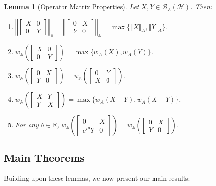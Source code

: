\documentclass{article}
\newcommand{\norm}[1]{\left\Vert#1\right\Vert}
\newtheorem{lemma}[theorem]{Lemma}
\begin{document}
\begin{lemma}[Operator Matrix Properties]
\label{lem:op_matrix}
Let $X, Y \in \mathcal{B}_A(\mathcal{H})$. Then:
\begin{enumerate}
    \item $\norm{\begin{bmatrix} X & 0 \\ 0 & Y \end{bmatrix}}_{\mathbb{A}} = \norm{\begin{bmatrix} 0 & X \\ Y & 0 \end{bmatrix}}_{\mathbb{A}} = \max\{\norm{X}_A, \norm{Y}_A\}$.
    \item $w_{\mathbb{A}}\left(\begin{bmatrix} X & 0 \\ 0 & Y \end{bmatrix}\right) = \max\{w_A(X), w_A(Y)\}$.
    \item $w_{\mathbb{A}}\left(\begin{bmatrix} 0 & X \\ Y & 0 \end{bmatrix}\right) = w_{\mathbb{A}}\left(\begin{bmatrix} 0 & Y \\ X & 0 \end{bmatrix}\right)$.
    \item $w_{\mathbb{A}}\left(\begin{bmatrix} X & Y \\ Y & X \end{bmatrix}\right) = \max\{w_A(X+Y), w_A(X-Y)\}$.
    \item For any $\theta \in \mathbb{R}$, $w_{\mathbb{A}}\left(\begin{bmatrix} 0 & X \\ e^{i\theta}Y & 0 \end{bmatrix}\right) = w_{\mathbb{A}}\left(\begin{bmatrix} 0 & X \\ Y & 0 \end{bmatrix}\right)$.
\end{enumerate}
\end{lemma}
\subsection{Main Theorems}

Building upon these lemmas, we now present our main results:
\end{document}
